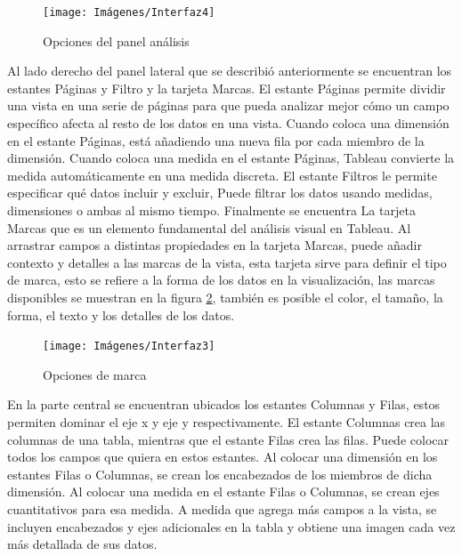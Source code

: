 \documentclass[
]{book}
\begin{document}
\begin{figure}

{\centering \texttt{[image: Imágenes/Interfaz4]} 

}

\caption{Opciones del panel análisis}\label{fig:analisis-fig}
\end{figure}

Al lado derecho del panel lateral que se describió anteriormente se encuentran los estantes Páginas y Filtro y la tarjeta Marcas. El estante Páginas permite dividir una vista en una serie de páginas para que pueda analizar mejor cómo un campo específico afecta al resto de los datos en una vista. Cuando coloca una dimensión en el estante Páginas, está añadiendo una nueva fila por cada miembro de la dimensión. Cuando coloca una medida en el estante Páginas, Tableau convierte la medida automáticamente en una medida discreta. El estante Filtros le permite especificar qué datos incluir y excluir, Puede filtrar los datos usando medidas, dimensiones o ambas al mismo tiempo. Finalmente se encuentra La tarjeta Marcas que es un elemento fundamental del análisis visual en Tableau. Al arrastrar campos a distintas propiedades en la tarjeta Marcas, puede añadir contexto y detalles a las marcas de la vista, esta tarjeta sirve para definir el tipo de marca, esto se refiere a la forma de los datos en la visualización, las marcas disponibles se muestran en la figura \ref{fig:marcas-fig}, también es posible el color, el tamaño, la forma, el texto y los detalles de los datos.

\begin{figure}

{\centering \texttt{[image: Imágenes/Interfaz3]} 

}

\caption{Opciones de marca}\label{fig:marcas-fig}
\end{figure}

En la parte central se encuentran ubicados los estantes Columnas y Filas, estos permiten dominar el eje x y eje y respectivamente. El estante Columnas crea las columnas de una tabla, mientras que el estante Filas crea las filas. Puede colocar todos los campos que quiera en estos estantes.
Al colocar una dimensión en los estantes Filas o Columnas, se crean los encabezados de los miembros de dicha dimensión. Al colocar una medida en el estante Filas o Columnas, se crean ejes cuantitativos para esa medida. A medida que agrega más campos a la vista, se incluyen encabezados y ejes adicionales en la tabla y obtiene una imagen cada vez más detallada de sus datos.
\end{document}
